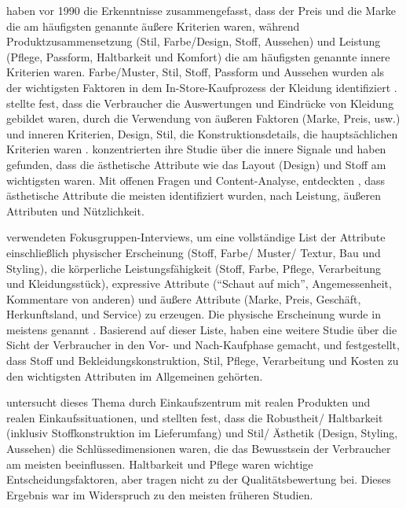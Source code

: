 \citet{eckman1990toward} haben vor 1990 die Erkenntnisse zusammengefasst, dass der Preis und die Marke die am häufigsten genannte äußere Kriterien waren, während Produktzusammensetzung (Stil, Farbe/Design, Stoff, Aussehen) und Leistung (Pflege, Passform, Haltbarkeit und Komfort) die am häufigsten genannte innere Kriterien waren. Farbe/Muster, Stil, Stoff, Passform und Aussehen wurden als der wichtigsten Faktoren in dem In-Store-Kaufprozess der Kleidung identifiziert \citep{eckman1990toward}. \citet{forsythe1991effect} stellte fest, dass die Verbraucher die Auswertungen und Eindrücke von Kleidung gebildet waren, durch die Verwendung von äußeren Faktoren (Marke, Preis, \ac{usw}.) und inneren Kriterien, Design, Stil, die Konstruktionsdetails, die hauptsächlichen Kriterien waren \citep{eckman1990toward}. \citet{fiore1992intrinsic} konzentrierten ihre Studie über die innere Signale und haben gefunden, dass die ästhetische Attribute wie das Layout (Design) und Stoff am wichtigsten waren. Mit offenen Fragen und Content-Analyse, entdeckten \citet{lennon1994categorization}, dass ästhetische Attribute die meisten identifiziert wurden, nach Leistung, äußeren Attributen und Nützlichkeit.

\citet{abraham1995consumers} verwendeten Fokusgruppen-Interviews, um eine vollständige List der Attribute einschließlich physischer Erscheinung (Stoff, Farbe/ Muster/ Textur, Bau und Styling), die körperliche Leistungsfähigkeit (Stoff, Farbe, Pflege, Verarbeitung und Kleidungsstück), expressive Attribute (``Schaut auf mich'', Angemessenheit, Kommentare von anderen) und äußere Attribute (Marke, Preis, Geschäft, Herkunftsland, und Service) zu erzeugen. Die physische Erscheinung wurde in meistens genannt \citep{abraham1995consumers}. Basierend auf dieser Liste, haben \citet{abraham1995perceptions} eine weitere Studie über die Sicht der Verbraucher in den Vor- und Nach-Kaufphase gemacht, und festgestellt, dass Stoff und Bekleidungskonstruktion, Stil, Pflege, Verarbeitung und Kosten zu den wichtigsten Attributen im Allgemeinen gehörten.

\citet{forsythe1996dimensions} untersucht dieses Thema durch Einkaufszentrum mit realen Produkten und realen Einkaufssituationen, und stellten fest, dass die Robustheit/ Haltbarkeit (inklusiv Stoffkonstruktion im Lieferumfang) und Stil/ Ästhetik (Design, Styling, Aussehen) die Schlüssedimensionen waren, die das Bewusstsein der Verbraucher am meisten beeinflussen. Haltbarkeit und Pflege waren wichtige Entscheidungsfaktoren, aber tragen nicht zu der Qualitätsbewertung bei. Dieses Ergebnis war im Widerspruch zu den meisten früheren Studien.

